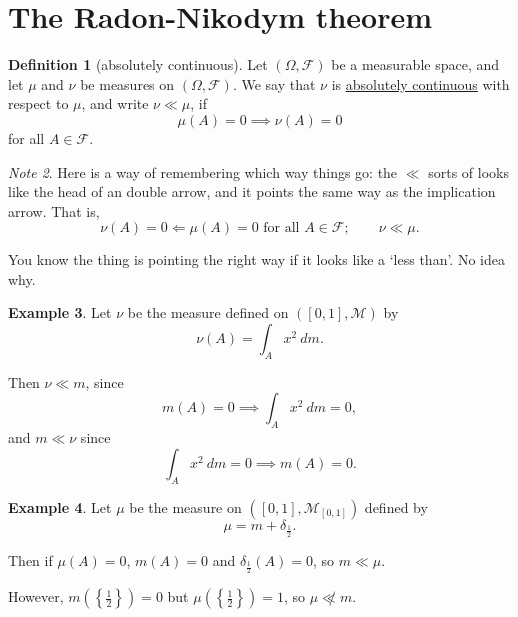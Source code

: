\documentclass[a4paper,12pt]{scrreprt}
\newcommand{\defn}[1]{\ul{#1}}
\theoremstyle{definition}
\newtheorem{definition}{Definition}
\newtheorem{example}[definition]{Example}
\theoremstyle{plain}
\theoremstyle{remark}
\newtheorem{note}[definition]{Note}
\begin{document}
\section{The Radon-Nikodym theorem}
\begin{definition}[absolutely continuous]
  \label{def:absolutelycontinuous}
  Let $(\Omega, \mathcal{F})$ be a measurable space, and let $\mu$ and $\nu$ be measures on $(\Omega, \mathcal{F})$. We say that $\nu$ is \defn{absolutely continuous} with respect to $\mu$, and write $\nu \ll \mu$, if
  \begin{equation*}
    \mu(A) = 0 \implies \nu(A) = 0
  \end{equation*}
  for all $A \in \mathcal{F}$.
\end{definition}

\begin{note}
  Here is a way of remembering which way things go: the $\ll$ sorts of looks like the head of an double arrow, and it points the same way as the implication arrow. That is,
  \begin{equation*}
    \nu(A) = 0 \Longleftarrow \mu(A) = 0 \text{ for all }A \in \mathcal{F};\qquad \nu \ll \mu.
  \end{equation*}

  You know the thing is pointing the right way if it looks like a `less than'. No idea why.
\end{note}

\begin{example}
  Let $\nu$ be the measure defined on $([0, 1], \mathcal{M})$ by
  \begin{equation*}
    \nu(A) = \int_{A} x^{2}\ dm.
  \end{equation*}

  Then $\nu \ll m$, since
  \begin{equation*}
    m(A) = 0 \implies \int_{A} x^{2}\ dm = 0,
  \end{equation*}
  and $m \ll \nu$ since
  \begin{equation*}
    \int_{A} x^{2}\ dm = 0 \implies m(A) = 0.
  \end{equation*}
\end{example}

\begin{example}
  Let $\mu$ be the measure on $([0, 1], \mathcal{M}_{[0, 1]})$ defined by
  \begin{equation*}
    \mu = m + \delta_{\frac{1}{2}}.
  \end{equation*}

  Then if $\mu(A) = 0$, $m(A) = 0$ and $\delta_{\frac{1}{2}}(A) = 0$, so $m \ll \mu$.

  However, $m\left( \left\{ \frac{1}{2} \right\} \right) = 0$ but $\mu\left( \left\{ \frac{1}{2} \right\} \right) = 1$, so $\mu \not\ll m$.
\end{example}
\end{document}

